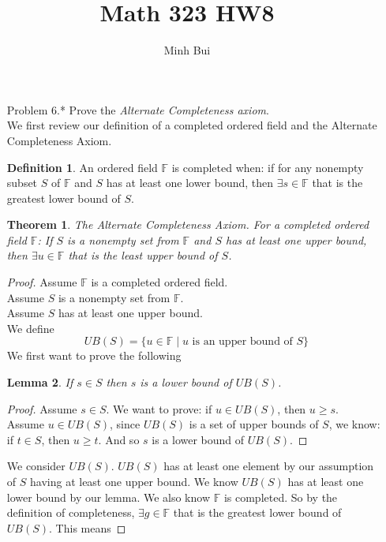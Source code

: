 \documentclass{article}
\author{Minh Bui}
\title{Math 323 HW8}
\theoremstyle{claim}
\newtheorem{theorem}{Theorem}[section]
\newtheorem{lemma}[theorem]{Lemma}
\theoremstyle{definition}
\newtheorem{definition}{Definition}
\begin{document}
\maketitle
\begin{enumerate}
    \item[Problem 6.*] Prove the \emph{Alternate Completeness axiom}.\\
        We first review our definition of a completed ordered field and the Alternate Completeness Axiom.
        \begin{definition}
            An ordered field $\mathbb{F}$ is completed when: if for any nonempty subset $S$ of $\mathbb{F}$ and $S$ has at least one lower bound, then $\exists s \in \mathbb{F}$ that is the greatest lower bound of $S$.
        \end{definition}
        \begin{theorem}
            \emph{The Alternate Completeness Axiom.} For a completed ordered field $\mathbb{F}$: If $S$ is a nonempty set from $\mathbb{F}$ and $S$ has at least one upper bound, then $\exists u \in \mathbb{F}$ that is the least upper bound of $S$.
        \end{theorem}
        \begin{proof}
            Assume $\mathbb{F}$ is a completed ordered field.\\
            Assume $S$ is a nonempty set from $\mathbb{F}$.\\
            Assume $S$ has at least one upper bound.\\
            We define
            \begin{equation*}
                UB(S) = \{ u \in \mathbb{F} \mid u \text{ is an upper bound of } S \}
            \end{equation*}
            We first want to prove the following
            \begin{lemma}
                If $s \in S$ then $s$ is a lower bound of $UB(S)$.
            \end{lemma}
            \begin{proof}
                Assume $s \in S$. We want to prove: if $u \in UB(S)$, then $u \ge s$.\\
                Assume $u \in UB(S)$, since $UB(S)$ is a set of upper bounds of $S$, we know: if $t \in S$, then $u \ge t$. And so $s$ is a lower bound of $UB(S)$.
            \end{proof}
            We consider $UB(S)$. $UB(S)$ has at least one element by our assumption of $S$ having at least one upper bound. We know $UB(S)$ has at least one lower bound by our lemma. We also know $\mathbb{F}$ is completed. So by the definition of completeness, $\exists g \in \mathbb{F}$ that is the greatest lower bound of $UB(S)$. This means

\end{proof}
\end{enumerate}
\end{document}
